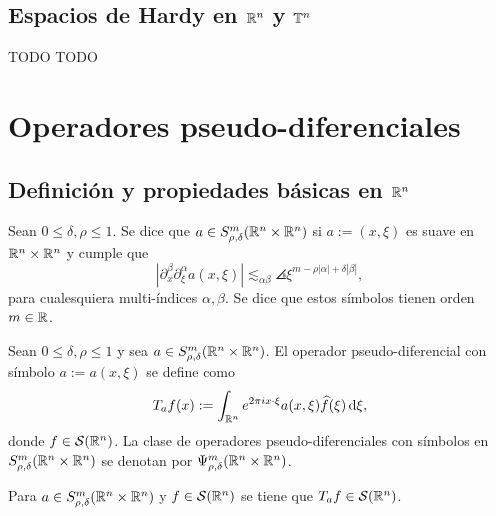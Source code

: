 \section{Espacios de Hardy en $\mathbb{R}^n$ y $\mathbb{T}^n$}
TODO TODO


\chapter{Operadores pseudo-diferenciales}

\section{Definición y propiedades básicas en $\mathbb{R}^n$}
\begin{definition}
	Sean $0\leq\delta,\rho\leq1$. Se dice que $a \in S^m_{\rho,\delta}(\mathbb{R}^n\times\mathbb{R}^n)$ si $a:=(x,\xi)$ es suave en $\mathbb{R}^n\times\mathbb{R}^n$ y cumple que
	\begin{equation*}
		|\partial^\beta_x\partial^\alpha_\xi a(x, \xi)| \lesssim_{\alpha\beta}\angles{\xi}^{m-\rho|\alpha|+\delta|\beta|},
	\end{equation*}
	para cualesquiera multi-índices $\alpha,\beta$. Se dice que estos símbolos tienen orden $m\in\mathbb{R}$.
\end{definition}
\begin{definition}
	Sean $0\leq\delta,\rho\leq1$ y sea $a \in S^m_{\rho,\delta}(\mathbb{R}^n\times\mathbb{R}^n)$. El operador pseudo-diferencial con símbolo $a:=a(x,\xi)$ se define como
	\begin{equation*}
		T_af(x):= \int_{\mathbb{R}^n} e^{2\pi ix\cdot\xi} a(x, \xi)\widehat{f}(\xi)\mathop{}\!\mathrm{d} \xi,
	\end{equation*}
	donde $f\in\mathcal{S}(\mathbb{R}^n)$. La clase de operadores pseudo-diferenciales con símbolos en $S^m_{\rho,\delta}(\mathbb{R}^n\times\mathbb{R}^n)$ se denotan por $\Psi^m_{\rho,\delta}(\mathbb{R}^n\times\mathbb{R}^n)$.
\end{definition}
\begin{proposition}
	Para $a \in S^m_{\rho,\delta}(\mathbb{R}^n\times\mathbb{R}^n)$ y $f\in\mathcal{S}(\mathbb{R}^n)$ se tiene que $T_af\in\mathcal{S}(\mathbb{R}^n)$.
\end{proposition}
